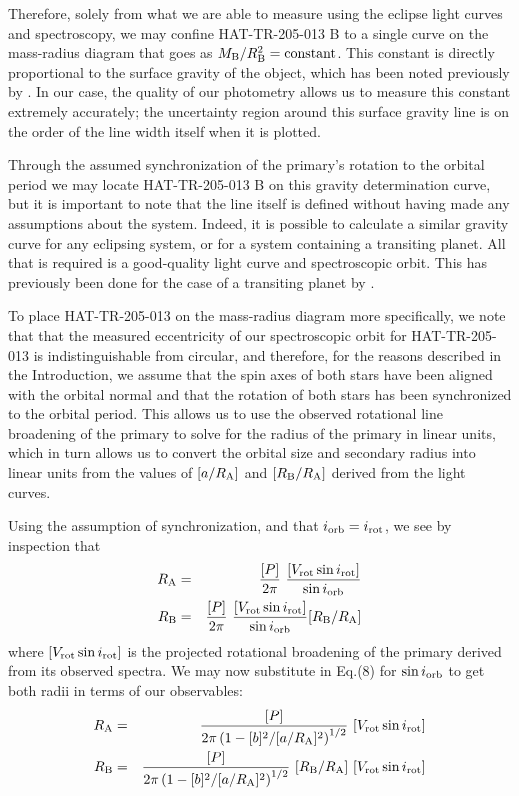 \documentclass[12pt, preprint]{aastex}
\begin{document}
Therefore, solely from what we are able to measure using the eclipse light curves and spectroscopy, we may confine HAT-TR-205-013 B to a single curve on the mass-radius diagram that goes as $M_{\rm B} /R_{\rm B}^2 = \rm{constant}$. This constant is directly proportional to the surface gravity of the object, which has been noted previously by \cite{southworth2004}. In our case, the quality of our photometry allows us to measure this constant extremely accurately; the uncertainty region around this surface gravity line is on the order of the line width itself when it is plotted.

Through the assumed synchronization of the primary's rotation to the orbital period we may locate HAT-TR-205-013 B on this gravity determination curve, but it is important to note that the line itself is defined without having made any assumptions about the system. Indeed, it is possible to calculate a similar gravity curve for any eclipsing system, or for a system containing a transiting planet. All that is required is a good-quality light curve and spectroscopic orbit. This has previously been done for the case of a transiting planet by \cite{winn2006}.

To place HAT-TR-205-013 on the mass-radius diagram more specifically, we note that that the measured eccentricity of our spectroscopic orbit for HAT-TR-205-013 is indistinguishable from circular, and therefore, for the reasons described in the Introduction, we assume that the spin axes of both stars have been aligned with the orbital normal and that the rotation of both stars has been synchronized to the orbital period. This allows us to use the observed rotational line broadening of the primary to solve for the radius of the primary in linear units, which in turn allows us to convert the orbital size and secondary radius into linear units from the values of $[a/R_{\rm A}]$ and $[R_{\rm B}/R_{\rm A}]$ derived from the light curves.

Using the assumption of synchronization, and that $i_{\rm orb} = i_{\rm rot}$, we see by inspection that 
\begin{eqnarray}
R_{\rm A} &=& \frac{[P]}{2\pi}\ \frac{[V_{\rm rot} \sin i_{\rm rot}]}
{\sin i_{\rm orb}}\\
R_{\rm B} &=& \frac{[P]}{2\pi}\ \frac{[V_{\rm rot} \sin i_{\rm rot}]}
{\sin i_{\rm orb}} [R_{\rm B}/R_{\rm A}]
\end{eqnarray} 
where $[V_{\rm rot} \sin i_{\rm rot}]$ is the projected rotational broadening of 
the primary derived from its observed spectra. We may now substitute in Eq.(8) for $\sin i_{\rm orb}$ to get both radii in terms of our observables:
\begin{eqnarray}
R_{\rm A} & = & \frac{[P]}{2\pi \left(1-[b]^2/[a/R_{\rm A}]^2\right)^{1/2}}\ [V_{\rm rot} \sin i_{\rm rot}]\\
R_{\rm B} & = & \frac{[P]}{2\pi \left(1-[b]^2/[a/R_{\rm A}]^2\right)^{1/2}}\ [R_{\rm B}/R_{\rm A}]\ [V_{\rm rot} \sin i_{\rm rot}]
\end{eqnarray}  
\end{document}
